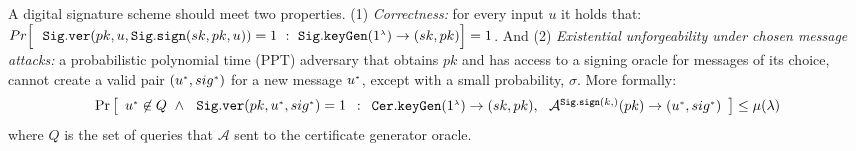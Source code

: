 
A digital signature scheme should meet  two properties. (1) \textit{Correctness:} for every input $u$ it holds that:
%
$Pr\Big[\  \  \mathtt{Sig.ver}( pk,\\ u, \mathtt{Sig.sign}(sk, pk, u))=1\ : \
\mathtt{Sig.keyGen}(1^{\scriptscriptstyle \lambda})\rightarrow (sk, pk)  \Big]=1$. And 
%
(2) \textit{Existential unforgeability under chosen message attacks:} a probabilistic polynomial time (PPT) adversary that obtains $pk$ and has access to a signing  oracle for messages of its choice, cannot create a valid pair $(u^{\scriptscriptstyle *},sig^{\scriptscriptstyle *})$ for a new message $u^{\scriptscriptstyle *}$, except with a small probability, $\sigma$. More formally: 
%
\small{
$$ \Pr\left[
  \begin{array}{l}
  u^{\st *}\not\in Q\ \wedge \ \
   \mathtt{Sig.ver}( pk,  u^{\st *}, sig^{\st *}) =1\\
% 
\end{array} : 
    \begin{array}{l}
    \mathtt{Cer.keyGen}(1^{\st \lambda})\rightarrow (sk,pk), \ \
  \mathcal{A}^{\mathtt{Sig.sign}(k,)}(pk)\rightarrow(u^{\st *}, sig^{\st *}) 
\end{array}    \right]\leq \mu(\lambda)$$
}
where $Q$ is the set of queries that $\mathcal{A}$ sent to the certificate generator oracle.






